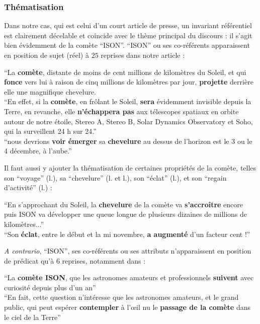 \documentclass[a4paper,10pt]{article}
\begin{document}
		\subsubsection{Thématisation}
			Dans notre cas, qui est celui d'un court article de presse, un invariant référentiel est clairement décelable et coïncide avec le thème principal du discours : il s'agit bien évidemment de la comète ``ISON''. ``ISON'' ou ses co-référents apparaissent en position de sujet (réel) à $25$ reprises dans notre article :
				\begin{center}
					\footnotesize
					\begin{minipage}{0.7\textwidth}
						``La \textbf{comète}, distante de moins de cent millions de kilomètres du Soleil, et qui \textbf{fonce} vers lui à raison de cinq millions de kilomètres par jour, \textbf{projette} derrière elle une magnifique chevelure.\\
						``En effet, si la \textbf{comète}, en frôlant le Soleil, \textbf{sera} évidemment invisible depuis la Terre, en revanche, elle \textbf{n'échappera pas} aux télescopes spatiaux en orbite autour de notre étoile, Stereo A, Stereo B, Solar Dynamics Observatory et Soho, qui la surveillent 24 h sur 24.''\\
						``nous devrions \textbf{voir émerger} sa \textbf{chevelure} au dessus de l'horizon est le 3 ou le 4 décembre, à l'aube.''
					\end{minipage}
				\end{center}
			Il faut aussi y ajouter la thématisation de certaines propriétés de la comète, telles son ``voyage'' (l.), sa ``chevelure'' (l. et l.), son ``éclat'' (l.), et son ``regain d'activité'' (l.) :
			\begin{center}
				\footnotesize
				\begin{minipage}{0.7\textwidth}
						``En s'approchant du Soleil, la \textbf{chevelure} de la comète va \textbf{s’accroître} encore puis ISON va développer une queue longue de plusieurs dizaines de millions de kilomètres...''\\
						``Son \textbf{éclat}, entre le début et la mi novembre, \textbf{a augmenté} d'un facteur cent !'' 
				\end{minipage}
			\end{center}
			\textit{A contrario}, ``ISON'', ses co-référents ou ses attributs n'apparaissent en position de prédicat qu'à $6$ reprises, notamment dans :
			\begin{center}
				\footnotesize
				\begin{minipage}{0.7\textwidth}
					``La \textbf{comète ISON}, que les astronomes amateurs et professionnels \textbf{suivent} avec curiosité depuis plus d'un an''\\
					``En fait, cette question n'intéresse que les astronomes amateurs, et le grand public, qui peut espérer \textbf{contempler} à l’œil nu le \textbf{passage de la comète} dans le ciel de la Terre'' 
				\end{minipage}
			\end{center}
\end{document}
